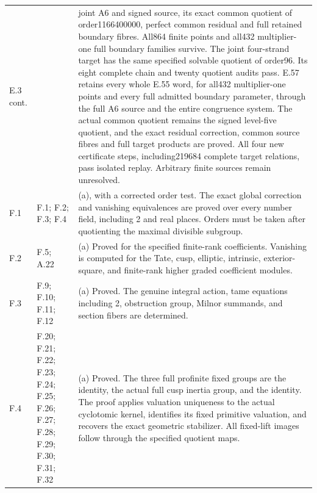 \begin{longtable}{@{}p{1.1cm}p{3.0cm}p{10.3cm}@{}}
E.3 cont. &  & joint A6 and signed source, its exact common quotient of order1166400000, perfect common residual and full retained boundary fibres. All864 finite points and all432 multiplier-one full boundary families survive. The joint four-strand target has the same specified solvable quotient of order96. Its eight complete chain and twenty quotient audits pass. E.57 retains every whole E.55 word, for all432 multiplier-one points and every full admitted boundary parameter, through the full A6 source and the entire congruence system. The actual common quotient remains the signed level-five quotient, and the exact residual correction, common source fibres and full target products are proved. All four new certificate steps, including219684 complete target relations, pass isolated replay. Arbitrary finite sources remain unresolved. \\
F.1 & F.1; F.2; F.3; F.4 & (a), with a corrected order test. The exact global correction and vanishing equivalences are proved over every number field, including 2 and real places. Orders must be taken after quotienting the maximal divisible subgroup. \\
F.2 & F.5; A.22 & (a) Proved for the specified finite-rank coefficients. Vanishing is computed for the Tate, cusp, elliptic, intrinsic, exterior-square, and finite-rank higher graded coefficient modules. \\
F.3 & F.9; F.10; F.11; F.12 & (a) Proved. The genuine integral action, tame equations including 2, obstruction group, Milnor summands, and section fibers are determined. \\
F.4 & F.20; F.21; F.22; F.23; F.24; F.25; F.26; F.27; F.28; F.29; F.30; F.31; F.32 & (a) Proved. The three full profinite fixed groups are the identity, the actual full cusp inertia group, and the identity. The proof applies valuation uniqueness to the actual cyclotomic kernel, identifies its fixed primitive valuation, and recovers the exact geometric stabilizer. All fixed-lift images follow through the specified quotient maps. \\
\bottomrule\end{longtable}
